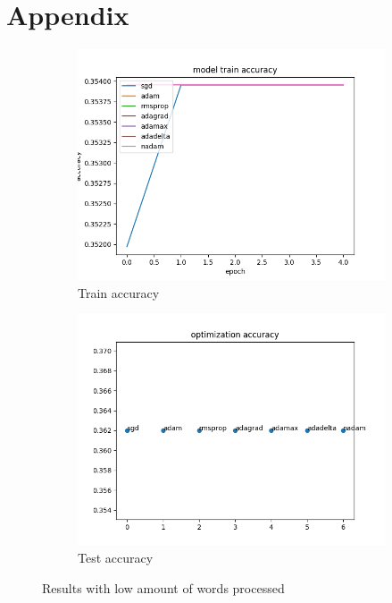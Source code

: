 \documentclass{article}
\begin{document}
\section{Appendix}
\begin{figure}[H]
    \centering
    \begin{subfigure}[b]{0.7\textwidth}
        \includegraphics[width=\textwidth]{low_maxword_total_train_accuracy.png}
        \caption{Train accuracy}
        \label{fig:taomw}
    \end{subfigure}
    \begin{subfigure}[b]{0.7\textwidth}
        \includegraphics[width=\textwidth]{low_maxword_total_opt_acc.png}
        \caption{Test accuracy}
        \label{fig:teaomw}
    \end{subfigure}
    \caption{Results with low amount of words processed}\label{fig:ovlowwords}
\end{figure}
\end{document}
